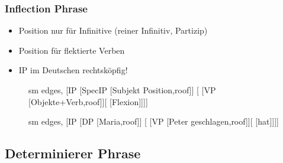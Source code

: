 \begin{frame}
\frametitle{Inflection Phrase}

	\begin{itemize}
		\item {} \ras Position nur für Infinitive (reiner Infinitiv, Partizip)
		\item {} \ras Position für flektierte Verben
		\item IP im Deutschen \ras rechtsköpfig!		
	\end{itemize}


\begin{figure}[b]
  	\begin{minipage}[b]{0.45\textwidth}
	\centering
	\footnotesize{
		\begin{forest}
		sm edges,
		[IP [SpecIP [Subjekt Position,roof]]
					[ [VP [Objekte+Verb,roof]][ [Flexion]]]]
		\end{forest}
		}
  	\end{minipage}  
	\begin{minipage}[b]{0.45\textwidth}
	\centering
	\footnotesize{
		\begin{forest}
		sm edges,
		[IP [DP [Maria,roof]]
					[ [VP [Peter geschlagen,roof]][\zerobar{I} [hat]]]]
		\end{forest}
		}
  	\end{minipage}  
\end{figure}

\end{frame}


\subsection{Determinierer Phrase}

